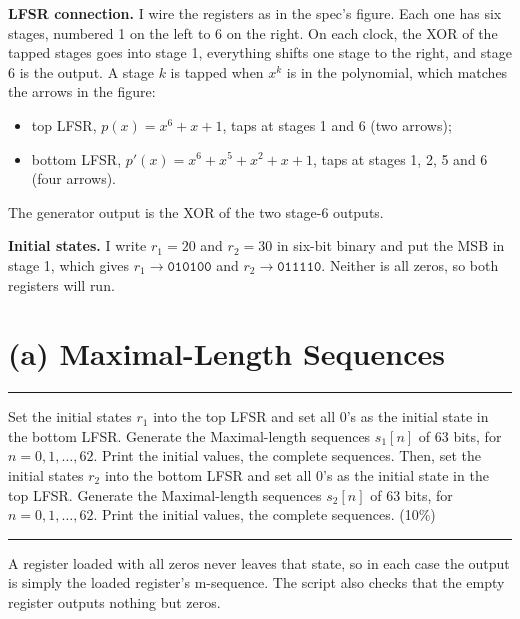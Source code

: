 \documentclass[12pt,a4paper]{report}
\newcommand{\question}[1]{%
    \hrule
    \vspace{0.2cm}
    #1
    \vspace{0.2cm}
    \hrule
    \vspace{0.5cm}
}
\begin{document}
\textbf{LFSR connection.} I wire the registers as in the spec's figure. Each one has six stages, numbered 1 on the
left to 6 on the right. On each clock, the XOR of the tapped stages goes into stage 1, everything shifts one stage to
the right, and stage 6 is the output. A stage $k$ is tapped when $x^k$ is in the polynomial, which matches the arrows in
the figure:
\begin{itemize}[leftmargin=1.5em]
    \item top LFSR, $p(x) = x^6 + x + 1$, taps at stages 1 and 6 (two arrows);
    \item bottom LFSR, $p'(x) = x^6 + x^5 + x^2 + x + 1$, taps at stages 1, 2, 5 and 6 (four arrows).
\end{itemize}
The generator output is the XOR of the two stage-6 outputs.

\textbf{Initial states.} I write $r_1 = 20$ and $r_2 = 30$ in six-bit binary and put the MSB in stage 1, which gives
$r_1 \to \texttt{010100}$ and $r_2 \to \texttt{011110}$. Neither is all zeros, so both registers will run.

\section{(a) Maximal-Length Sequences}

\question{Set the initial states $r_1$ into the top LFSR and set all 0's as the initial state in the bottom LFSR.
Generate the Maximal-length sequences $s_1[n]$ of 63 bits, for $n = 0, 1, \ldots, 62$. Print the initial values, the
complete sequences. Then, set the initial states $r_2$ into the bottom LFSR and set all 0's as the initial state in the
top LFSR. Generate the Maximal-length sequences $s_2[n]$ of 63 bits, for $n = 0, 1, \ldots, 62$. Print the initial
values, the complete sequences. (10\%)}

A register loaded with all zeros never leaves that state, so in each case the output is simply the loaded register's
m-sequence. The script also checks that the empty register outputs nothing but zeros.

\begin{table}[H]
\centering
\caption{Initial Register Values}
\setlength{\tabcolsep}{14pt}
\renewcommand{\arraystretch}{1.2}

\end{table}

\begin{table}[H]
\centering
\caption{Complete m-Sequences $s_1[n]$ and $s_2[n]$ (9 bits per row, $n$ increasing left to right)}
\setlength{\tabcolsep}{14pt}
\renewcommand{\arraystretch}{1.1}

\end{table}
\end{document}
